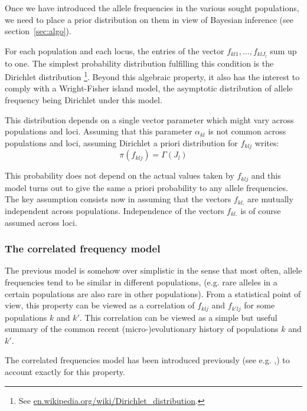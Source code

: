 \documentclass{article}
\begin{document}
Once we have introduced the allele frequencies in the various sought populations, we need to place a prior distribution on them 
in view of Bayesian inference (see section~\ref{sec:algo}).

For each population and each locus, the entries of the vector $f_{kl1},...,f_{klJ_l}$ sum up to one. 
The simplest probability distribution fulfilling this condition is the Dirichlet distribution 
\footnote{See \url{ en.wikipedia.org/wiki/Dirichlet\_distribution}.}.
Beyond this algebraic property, 
it also has the interest to comply with a Wright-Fisher island model, the asymptotic distribution of allele frequency being 
Dirichlet under this model. 

This distribution depends on a single vector parameter which might vary across populations and loci. 
Assuming that this parameter $\alpha_{kl}$ is not common across 
populations and loci, assuming Dirichlet a priori distribution for $f_{klj}$ writes:
 \begin{equation}\label{eq:UFM}
\pi(f_{klj}) = \Gamma(J_l)
\end{equation}

This probability does not depend on the actual values taken by $f_{klj}$ and this model turns out to give the same 
a priori probability to any allele frequencies. 
The key assumption consists now in assuming that the vectors $f_{kl.}$ are mutually independent across populations. 
Independence  of the vectors $f_{kl.}$ is of course assumed across loci.


\subsubsection{The correlated frequency model}

The previous model is somehow over simplistic in the sense that most often, allele frequencies tend to be 
similar in different populations, 
(e.g. rare alleles  in a certain populations are also rare in other 
populations). From a statistical point of view, this property can be viewed as a correlation of $f_{klj}$ and $f_{k'lj}$ 
for some populations $k$ and $k'$.
This correlation can be viewed as a simple but useful summary of the common recent (micro-)evolutionary history of populations $k$ and $k'$.


The correlated frequencies model has been introduced previously 
(see e.g. \citep{Balding03},\citep{Nicholson02})  to account exactly for this property.
\end{document}

